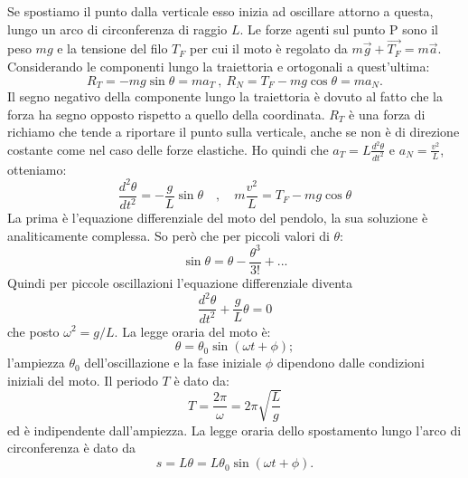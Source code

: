 \documentclass[class=book, crop=false, oneside, 12pt]{standalone}
\begin{document}
Se spostiamo il punto dalla verticale esso inizia ad oscillare attorno a questa, lungo un arco di circonferenza di raggio \(L\).
Le forze agenti sul punto P sono il peso \( m g\) e la tensione del filo \(T_F\) per cui il moto è regolato da \(m \overrightarrow{g} + \overrightarrow{T_F} = m \overrightarrow{a}\).
Considerando le componenti lungo la traiettoria e ortogonali a quest'ultima:
\begin{equation*}
    R_T = -mg \sin \theta = m a_T \ , \ R_N = T_F - mg \cos \theta = m a_N .
\end{equation*}
Il segno negativo della componente lungo la traiettoria è dovuto al fatto che  la forza ha segno opposto rispetto a quello della coordinata.
\(R_T\) è una forza di richiamo che tende a riportare il punto sulla verticale, anche se non è di direzione costante come nel caso delle forze elastiche.\newline
Ho quindi che \(a_T = L \frac {d^2 \theta} {dt^2}\) e \(a_N = \frac {v^2}{L}\), otteniamo:
\begin{equation*}
    \frac{d^{2} \theta}{d t^{2}}=-\frac{g}{L} \sin \theta \quad, \quad m \frac{v^{2}}{L}=T_{F}-m g \cos \theta
\end{equation*}
La prima è l'equazione differenziale del moto del pendolo, la sua soluzione è analiticamente complessa.
So però che per piccoli valori di \(\theta\):
\begin{equation*}
    \sin \theta = \theta - \frac {\theta^3} {3!} + ...
\end{equation*}
Quindi per piccole oscillazioni l'equazione differenziale diventa
\begin{equation*}
    \frac{d^2 \theta}{dt^2} + \frac{g}{L} \theta = 0
\end{equation*}
che posto \(\omega^2 = g/L\).\newline
La legge oraria del moto è:
\begin{equation}
    \theta = \theta_0 \sin (\omega t + \phi) ; 
\end{equation}
l'ampiezza \(\theta_0\) dell'oscillazione e la fase iniziale \(\phi\) dipendono dalle condizioni iniziali del moto.\newline
Il periodo \(T\) è dato da:
\begin{equation}
    T = \frac{2 \pi}{ \omega} = 2 \pi \sqrt{\frac{L}{g}}
\end{equation}
ed è indipendente dall'ampiezza.\newline
La legge oraria dello spostamento lungo l'arco di circonferenza è dato da
\begin{equation*}
    s = L \theta = L \theta_0 \sin (\omega t + \phi).
\end{equation*}
\end{document}
